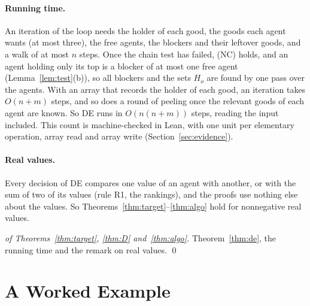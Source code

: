\documentclass[runningheads,11pt]{llncs}
\newcommand{\DE}{\textup{DE}}
\begin{document}
\paragraph{Running time.} An iteration of the loop needs the holder of each good, the goods each agent wants (at most three), the free agents, the blockers and their leftover goods, and a walk of at most $n$ steps. Once the chain test has failed, (NC) holds, and an agent holding only its top is a blocker of at most one free agent (Lemma~\ref{lem:test}(b)), so all blockers and the sets $H_o$ are found by one pass over the agents. With an array that records the holder of each good, an iteration takes $O(n+m)$ steps, and so does a round of peeling once the relevant goods of each agent are known. So \DE{} runs in $O(n(n+m))$ steps, reading the input included. This count is machine-checked in Lean, with one unit per elementary operation, array read and array write (Section~\ref{sec:evidence}).

\paragraph{Real values.} Every decision of \DE{} compares one value of an agent with another, or with the sum of two of its values (rule R1, the rankings), and the proofs use nothing else about the values. So Theorems~\ref{thm:target}--\ref{thm:algo} hold for nonnegative real values.

\begin{proof}[of Theorems~\ref{thm:target}, \ref{thm:D} and~\ref{thm:algo}]
Theorem~\ref{thm:de}, the running time and the remark on real values. \qed
\end{proof}

\section{A Worked Example}\label{sec:example}
\end{document}

